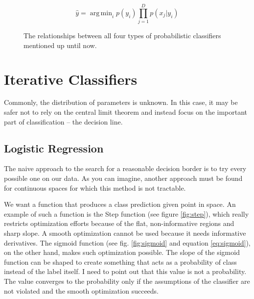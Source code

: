 \documentclass{article}
\DeclareMathOperator*{\argmin}{arg\,min}
\begin{document}
\begin{equation}
    \hat{y} = \argmin_i p(y_i) \prod_{j=1}^D p(x_j | y_i)
    \label{eq:general_bayes}
\end{equation}


\begin{figure}[h]
    \centering
    \caption{ The relationships between all four types of probabilistic classifiers mentioned up until now. }
\end{figure}

\newpage
\section{Iterative Classifiers}
Commonly, the distribution of parameters is unknown. In this case, it may be safer not to rely on the central limit theorem and instead focus on the important part of classification -- the decision line.


\subsection{Logistic Regression}
The naive approach to the search for a reasonable decision border is to try every possible one on our data. 
As you can imagine, another approach must be found for continuous spaces for which this method is not tractable.

We want a function that produces a class prediction given point in space. 
An example of such a function is the Step function (see figure \ref{fig:step}), which really restricts optimization efforts because of the flat, non-informative regions and sharp slope. 
A smooth optimization cannot be used because it needs informative derivatives. 
The sigmoid function (see fig. \ref{fig:sigmoid} and equation \ref{eq:sigmoid}), on the other hand, makes such optimization possible.
The slope of the sigmoid function can be shaped to create something that acts as a probability of class instead of the label itself. 
I need to point out that this value is not a probability. 
The value converges to the probability only if the assumptions of the classifier are not violated and the smooth optimization succeeds.
\end{document}
